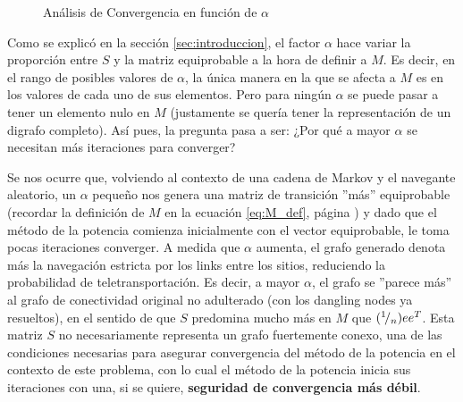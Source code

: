 \begin{figure}[H]
    \centering
    \caption{An\'alisis de Convergencia en funci\'on de $\alpha$}
\end{figure}

\par Como se explic\'o en la secci\'on \ref{sec:introduccion}, el factor
$\alpha$ hace variar la proporci\'on entre $S$ y la matriz equiprobable a la
hora de definir a $M$. Es decir, en el rango de posibles valores de $\alpha$, la
\'unica manera en la que se afecta a $M$ es en los valores de cada uno de sus
elementos. Pero para ning\'un $\alpha$ se puede pasar a tener un elemento nulo
en $M$ (justamente se quer\'ia tener la representaci\'on de un digrafo
completo). As\'i pues, la pregunta pasa a ser: ¿Por qu\'e a mayor $\alpha$ se
necesitan m\'as iteraciones para converger?

\par Se nos ocurre que, volviendo al contexto de una cadena de Markov y el
navegante aleatorio, un $\alpha$ peque\~no nos genera una matriz de transici\'on
''m\'as'' equiprobable (recordar la definici\'on de $M$ en la ecuaci\'on
\ref{eq:M_def}, p\'agina \pageref{eq:M_def}) y dado que el método de la potencia
comienza inicialmente con el vector equiprobable, le toma pocas iteraciones
converger. A medida que $\alpha$ aumenta, el grafo generado denota más la
navegación estricta por los links entre los sitios, reduciendo la probabilidad
de teletransportación. Es decir, a mayor $\alpha$, el grafo se ''parece m\'as''
al grafo de conectividad original no adulterado (con los dangling nodes ya
resueltos), en el sentido de que $S$ predomina mucho m\'as en $M$ que
$({}^{1}\!/_{n})ee^T$. Esta matriz $S$ no necesariamente representa un grafo
fuertemente conexo, una de las condiciones necesarias para asegurar convergencia
del método de la potencia en el contexto de este problema, con lo cual el método
de la potencia inicia sus iteraciones con una, si se quiere, \textbf{seguridad
de convergencia más débil}.

